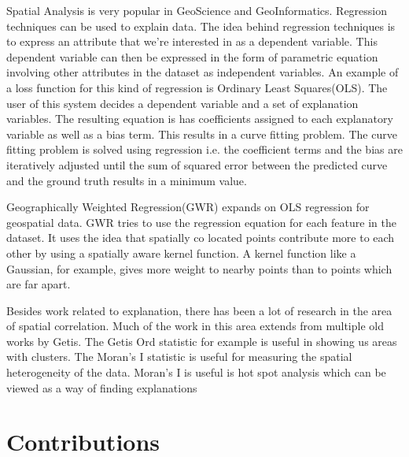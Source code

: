 Spatial Analysis is very popular in GeoScience and GeoInformatics. Regression techniques can be used to explain data\citep{dunn1986applied,cleveland1988locally}. The idea behind regression techniques is to express an attribute that we're interested in as a dependent variable. This dependent variable can then be expressed in the form of parametric equation involving other attributes in the dataset as independent variables. An example of a loss function for this kind of regression is Ordinary Least Squares(OLS)\citep{dismuke2006ordinary}. The user of this system decides a dependent variable and a set of explanation variables. The resulting equation is has coefficients assigned to each explanatory variable as well as a bias term. This results in a curve fitting problem. The curve fitting problem is solved using regression i.e. the coefficient terms and the bias are iteratively adjusted until the sum of squared error between the predicted curve and the ground truth results in a minimum value.

Geographically Weighted Regression(GWR) expands on OLS regression for geospatial data\citep{brunsdon1998geographically,charlton2009geographically}. GWR tries to use the regression equation for each feature in the dataset. It uses the idea that spatially co located points contribute more to each other by using a spatially aware kernel function. A kernel function like a Gaussian, for example, gives more weight to nearby points than to points which are far apart.

Besides work related to explanation, there has been a lot of research in the area of spatial correlation. Much of the work in this area extends from multiple old works by Getis\citep{getis1991spatial,ord1995local,getis1996local,getis2002comparative,getis2007reflections}. The Getis Ord statistic \citep{ord1995local} for example is useful in showing us areas with clusters. The Moran's I statistic is useful for measuring the spatial heterogeneity of the data\citep{assuncao1999new,zhang2008use}. Moran's I is useful is hot spot analysis which can be viewed as a way of finding explanations

\section{Contributions}

